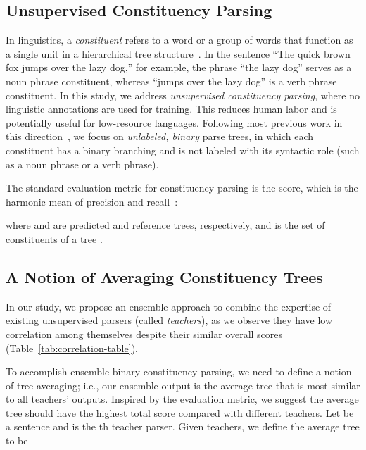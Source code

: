 \documentclass{article}
\begin{document}
\subsection{Unsupervised Constituency Parsing}
\label{subsection:unsupConstPars}

In linguistics, a \textit{constituent} refers to a word or a group of words that function as a single unit in a hierarchical tree structure~\citep{constituencyTree}. In the sentence ``The quick brown fox jumps over the lazy dog,'' for example, the phrase ``the lazy dog'' serves as a noun phrase constituent, whereas ``jumps over the lazy dog'' is a verb phrase constituent. In this study, we address \textit{unsupervised constituency parsing}, where no linguistic annotations are used for training. This reduces human labor and is potentially useful for low-resource languages. Following most previous work in this direction~\citep{cao-etal-2020-unsupervised,maveli-cohen-2022-co,li-lu-2023-contextual}, we focus on \textit{unlabeled, binary} parse trees, in which each constituent has a binary branching and is not labeled with its syntactic role (such as a noun phrase or a verb phrase).

The standard evaluation metric for constituency parsing is the  score, which is the harmonic mean of precision and recall~\citep{shen2017neural,SupervisedCRFConstituencyParsing}:

where  and  are predicted and reference trees, respectively, and  is the set of constituents of a tree .

\subsection{A Notion of Averaging Constituency Trees} 

In our study, we propose an ensemble approach to combine the expertise of existing unsupervised parsers (called \textit{teachers}), as we observe they have low correlation among themselves despite their similar overall  scores (Table~\ref{tab:correlation-table}).

To accomplish ensemble binary constituency parsing, we need to define a notion of tree averaging; i.e., our ensemble output is the average tree that is most similar to all teachers' outputs. Inspired by the evaluation metric, we suggest the average tree should have the highest total  score compared with different teachers. Let  be a sentence and  is the th teacher parser. Given  teachers, we define the average tree to be
\end{document}
